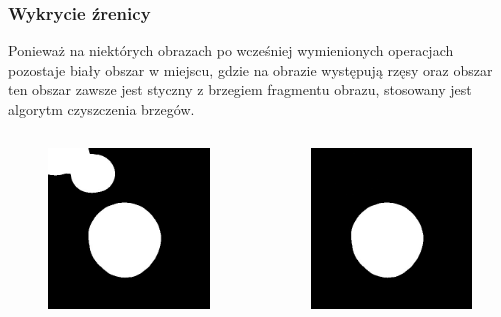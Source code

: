 \documentclass{beamer}
\begin{document}
\begin{frame}
\frametitle{Wykrycie źrenicy}
Ponieważ na niektórych obrazach po wcześniej wymienionych operacjach pozostaje biały obszar w miejscu, gdzie na obrazie występują rzęsy oraz obszar ten obszar zawsze jest styczny z brzegiem fragmentu obrazu, stosowany jest algorytm czyszczenia brzegów.
\begin{columns}
		\begin{figure}
		\begin{center}
		\includegraphics[scale=0.25]{roi1.jpg}
		\end{center}
		\end{figure}
		\begin{figure}
		\begin{center}
		\includegraphics[scale=0.25]{roi2.jpg}
		\end{center}
		\end{figure}
\end{columns}
\end{frame}
\end{document}
